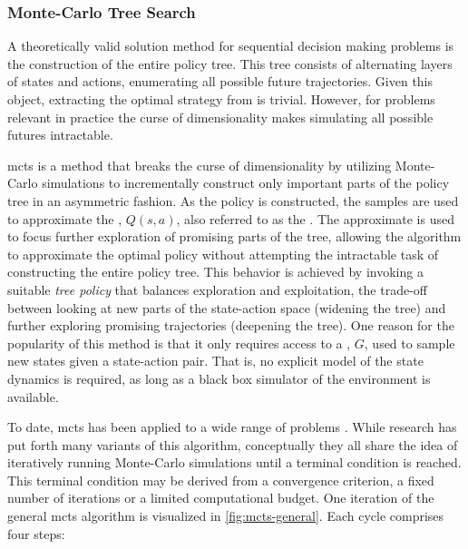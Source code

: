 \subsubsection{Monte-Carlo Tree Search}
A theoretically valid solution method for sequential decision making problems
is the construction of the entire policy tree. This tree consists of alternating
layers of states and actions, enumerating all possible future trajectories.
Given this object, extracting the optimal strategy from is trivial. However,
for problems relevant in practice the curse of dimensionality makes simulating
all possible futures intractable.

\acf{mcts} is a method that breaks the curse of dimensionality by utilizing
Monte-Carlo simulations to incrementally construct only important parts of the
policy tree in an asymmetric fashion. As the policy is constructed, the samples
are used to approximate the , $Q(s, a)$,
also referred to as the \vname{\qfunction}. The approximate \qfunction is used
to focus further exploration of promising parts of the tree, allowing the
algorithm to approximate the optimal policy without attempting the intractable
task of constructing the entire policy tree. This behavior is achieved by
invoking a suitable \emph{tree policy} that balances exploration and
exploitation, the trade-off between looking at new parts of the state-action
space (widening the tree) and further exploring promising trajectories
(deepening the tree). One reason for the popularity of this method is that
it only requires access to a , $G$, used to sample new states
given a state-action pair. That is, no explicit model of the state dynamics is
required, as long as a black box simulator of the environment is available.

To date, \ac{mcts} has been applied to a wide range of problems
\cite{browne2012survey}. While research has put forth many variants of this
algorithm, conceptually they all share the idea of iteratively running
Monte-Carlo simulations until a terminal condition is reached. This terminal
condition may be derived from a convergence criterion, a fixed number of
iterations or a limited computational budget. One iteration of the general
\ac{mcts} algorithm is visualized in \cref{fig:mcts-general}. Each cycle
comprises four steps:

